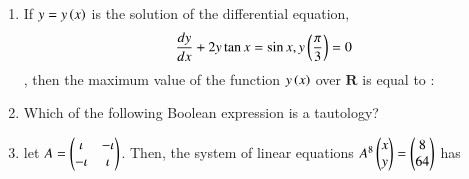 \documentclass[journal]{IEEEtran}
\numberwithin{equation}{enumi}
\numberwithin{figure}{enumi}
\begin{document}
\begin{enumerate}
    \item 
    If $y = y\left(x\right)$ is the solution of the differential equation, 
    \begin{align*}
        \frac{dy}{dx} + 2y\tan{x} = \sin{x}, y\left(\frac{\pi}{3}\right) = 0
    \end{align*}, then the maximum value of the function $y\left(x\right)$ over $\mathbf{R}$ is equal to :
    \begin{enumerate}
    \end{enumerate}

    \item 
    Which of the following Boolean expression is a tautology?
    \begin{enumerate}
    \end{enumerate}

    \item let $A = \begin{pmatrix}\iota&-\iota\\ -\iota&\iota\end{pmatrix}$.
    Then, the system of linear equations $A^8\begin{pmatrix}x\\y\end{pmatrix} = \begin{pmatrix}8 \\ 64\end{pmatrix}$ has 
    \begin{enumerate}
    \end{enumerate}

    
\end{enumerate}
\end{document}
